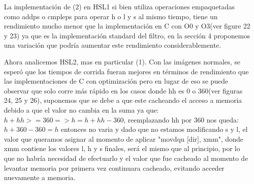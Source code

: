 \documentclass[a4paper]{article}
\begin{document}
La implementación de (2) en HSL1 si bien utiliza operaciones empaquetadas como addps o cmpleps para operar h o l y s al mismo tiempo, tiene un rendimiento mucho menor que la implementación en C con O0 y O3(ver figure 22 y 23) ya que es la implementación standard del filtro, en la sección 4 proponemos una variación que podría aumentar este rendimiento considerablemente.\newline

Ahora analicemos HSL2, mas en particular (1). Con las imágenes normales, se esperó que los tiempos de corrida fueran mejores en términos de rendimiento que las implementaciones de C con optimización pero en lugar de eso se puede observar que solo corre más rápido en los casos donde hh es 0 o 360(ver figuras 24, 25 y 26), suponemos que se debe a que este cacheando el acceso a memoria debido a que el valor no cambia en la suma ya que: $h + hh >= 360 =>h = h+hh-360$, reemplazando hh por 360 nos queda: $h + 360 - 360 = h$ entonces no varia y dado que no estamos modificando s y l, el valor que queramos asignar al momento de aplicar "movdqu [dir], xmm", donde xmm contiene los valores l, h y s finales, será el mismo que al principio, por lo que no habría necesidad de efectuarlo y el valor que fue cacheado al momento de levantar memoria por primera vez continuara cacheado, evitando acceder nuevamente a memoria.  
\end{document}
